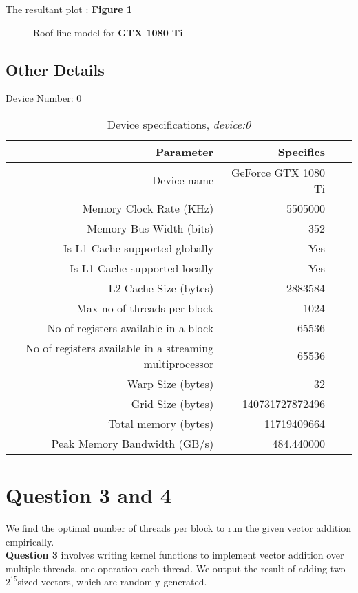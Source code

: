 The resultant plot : \textbf{Figure 1}

\begin{figure}[ht]
\centering
\caption{Roof-line model for \textbf{GTX 1080 Ti}}
\end{figure}

  \subsection{Other Details}
Device Number: 0
  
  
  \begin{table}[ht]
\footnotesize
\centering
\begin{tabular}{r||rrr}
Parameter & Specifics  \\ 
 \hline \hline
Device name & GeForce GTX 1080 Ti \\
  Memory Clock Rate (KHz) & 5505000 \\
  Memory Bus Width (bits) & 352 \\
  Is L1 Cache supported globally & Yes \\
  Is L1 Cache supported locally & Yes \\
  L2 Cache Size (bytes) & 2883584 \\
  Max no of threads per block & 1024 \\
  No of registers available in a block & 65536 \\
  No of registers available in a streaming multiprocessor & 65536 \\
  Warp Size (bytes)&  32 \\
  Grid Size (bytes) & 140731727872496 \\
  Total memory (bytes) & 11719409664 \\
  Peak Memory Bandwidth (GB/s) & 484.440000 \\
\end{tabular}
\caption{Device specifications, \textit{device:0}}
\end{table}

\newpage

\section {Question 3 and 4}
\noindent We find the optimal number of threads per block to run the given vector addition empirically. \\

\textbf{Question 3} involves writing kernel functions to implement vector addition over multiple threads, one operation each thread. We output the result of adding two $2^{15} $sized vectors, which are randomly generated. \\


